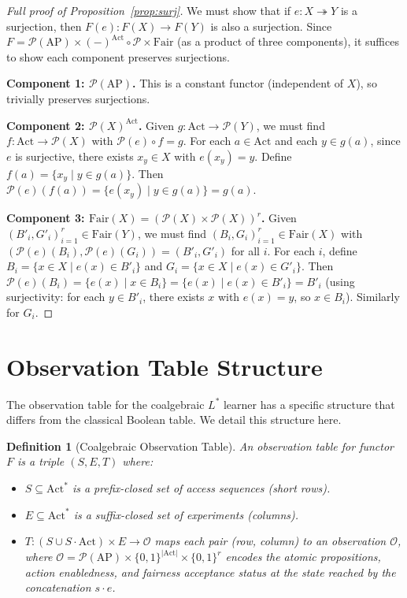 \documentclass[11pt]{article}
\newtheorem{definition}[theorem]{Definition}
\newcommand{\Pow}{\mathcal{P}}
\newcommand{\Fair}{\ensuremath{\mathrm{Fair}}}
\newcommand{\Act}{\ensuremath{\mathrm{Act}}}
\newcommand{\AP}{\ensuremath{\mathrm{AP}}}
\begin{document}
\begin{proof}[Full proof of Proposition~\ref{prop:surj}]
We must show that if $e : X \twoheadrightarrow Y$ is a surjection, then
$F(e) : F(X) \to F(Y)$ is also a surjection.
Since $F = \Pow(\AP) \times (\mathord{-})^{\Act} \circ \Pow \times \Fair$
(as a product of three components), it suffices to show each component
preserves surjections.

\textbf{Component 1: $\Pow(\AP)$.}
This is a constant functor (independent of $X$), so trivially preserves
surjections.

\textbf{Component 2: $\Pow(X)^{\Act}$.}
Given $g : \Act \to \Pow(Y)$, we must find $f : \Act \to \Pow(X)$ with
$\Pow(e) \circ f = g$.
For each $a \in \Act$ and each $y \in g(a)$, since $e$ is surjective,
there exists $x_y \in X$ with $e(x_y) = y$.
Define $f(a) = \{x_y \mid y \in g(a)\}$.
Then $\Pow(e)(f(a)) = \{e(x_y) \mid y \in g(a)\} = g(a)$.

\textbf{Component 3: $\Fair(X) = (\Pow(X) \times \Pow(X))^r$.}
Given $(B'_i, G'_i)_{i=1}^r \in \Fair(Y)$, we must find
$(B_i, G_i)_{i=1}^r \in \Fair(X)$ with
$(\Pow(e)(B_i), \Pow(e)(G_i)) = (B'_i, G'_i)$ for all $i$.
For each $i$, define $B_i = \{x \in X \mid e(x) \in B'_i\}$ and
$G_i = \{x \in X \mid e(x) \in G'_i\}$.
Then $\Pow(e)(B_i) = \{e(x) \mid x \in B_i\} = \{e(x) \mid e(x) \in B'_i\}
= B'_i$ (using surjectivity: for each $y \in B'_i$, there exists $x$ with
$e(x) = y$, so $x \in B_i$).
Similarly for $G_i$.
\end{proof}

\section{Observation Table Structure}
\label{app:table}

The observation table for the coalgebraic $L^*$ learner has a specific
structure that differs from the classical Boolean table.
We detail this structure here.

\begin{definition}[Coalgebraic Observation Table]
An observation table for functor $F$ is a triple $(S, E, T)$ where:
\begin{itemize}[nosep]
\item $S \subseteq \Act^*$ is a prefix-closed set of \emph{access sequences}
  (short rows).
\item $E \subseteq \Act^*$ is a suffix-closed set of \emph{experiments}
  (columns).
\item $T : (S \cup S \cdot \Act) \times E \to \mathcal{O}$ maps each pair
  (row, column) to an \emph{observation} $\mathcal{O}$, where
  $\mathcal{O} = \Pow(\AP) \times \{0, 1\}^{|\Act|} \times \{0,1\}^r$
  encodes the atomic propositions, action enabledness, and fairness
  acceptance status at the state reached by the concatenation $s \cdot e$.
\end{itemize}
\end{definition}
\end{document}
